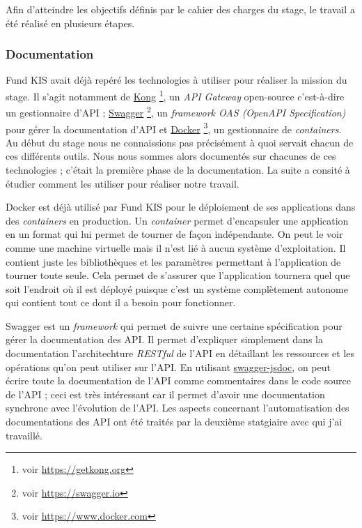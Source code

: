 Afin d'atteindre les objectifs définis par le cahier des charges du stage, le travail a été réalisé en plusieurs étapes.

\subsubsection{Documentation}
Fund KIS avait déjà repéré les technologies à utiliser pour réaliser la mission du stage. Il s'agit notamment de \href{https://getkong.org}{Kong} \footnote{voir \url{https://getkong.org}}, un \textit{API Gateway} open-source c'est-à-dire un gestionnaire d'API ; \href{https://swagger.io}{Swagger} \footnote{voir \url{https://swagger.io}}, un \textit{framework OAS (OpenAPI Specification)} pour gérer la documentation d'API et \href{https://www.docker.com}{Docker} \footnote{voir \url{https://www.docker.com}}, un gestionnaire de \textit{containers}. Au début du stage nous ne connaissions pas précisément à quoi servait chacun de ces différents outils. Nous nous sommes alors documentés sur chacunes de ces technologies ; c'était la première phase de la documentation. La suite a consité à étudier comment les utiliser pour réaliser notre travail.

\vspace{3mm}

Docker est déjà utilisé par Fund KIS pour le déploiement de ses applications dans des \textit{containers} en production. Un \textit{container} permet d'encapsuler une application en un format qui lui permet de tourner de façon indépendante. On peut le voir comme une machine virtuelle mais il n'est lié à aucun système d'exploitation. Il contient juste les bibliothèques et les paramètres permettant à l'application de tourner toute seule. Cela permet de s'assurer que l'application tournera quel que soit l'endroit où il est déployé puisque c'est un système complètement autonome qui contient tout ce dont il a besoin pour fonctionner.

\vspace{3mm}

Swagger est un \textit{framework} qui permet de suivre une certaine spécification pour gérer la documentation des API. Il permet d'expliquer simplement dans la documentation l'architechture \textit{RESTful} de l'API en détaillant les ressources et les opérations qu'on peut utiliser sur l'API. En utilisant \href{https://github.com/Surnet/swagger-jsdoc}{swagger-jsdoc}, on peut écrire toute la documentation de l'API comme commentaires dans le code source de l'API ; ceci est très intéressant car il permet d'avoir une documentation synchrone avec l'évolution de l'API. Les aspects concernant l'automatisation des documentations des API ont été traités par la deuxième statgiaire avec qui j'ai travaillé.

